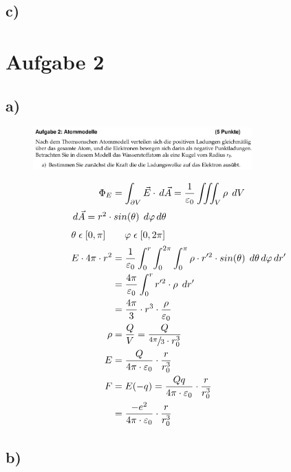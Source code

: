 \subsection{c)}

\section{Aufgabe 2}

\subsection{a)}

\begin{figure}[H]
    \centering
    \includegraphics[width=0.75\textwidth]{images/Aufgabe_2a.jpg}
    \label{fig:5}
\end{figure}

    \begin{align}
        \Phi_E &= \int_{\partial V} \vec{E} \cdot \,d\vec{A} = \frac{1}{\varepsilon_0} \iiint_{V} \rho \; \,dV\\
        \intertext{$\,d\vec{A} = r^2 \cdot sin(\theta) \; \,d\varphi \,d\theta$
        }
        \intertext{$\theta \; \epsilon \; [0,\pi] \qquad \varphi \; \epsilon \; [0, 2\pi]$
        }
        E \cdot 4\pi \cdot r^2 &= \frac{1}{\varepsilon_0} \int_{0}^{r}\int_{0}^{2\pi}\int_{0}^{\pi} \rho \cdot r'^2 \cdot sin(\theta)\; \,d\theta \,d\varphi \,dr'\\
        &= \frac{4\pi}{\varepsilon_0} \int_{0}^{r} r'^2 \cdot \rho \; \,dr'\\
        &= \frac{4\pi}{3} \cdot r^3 \cdot \frac{\rho}{\varepsilon_0}\\
        \rho &= \frac{Q}{V} = \frac{Q}{\sfrac{4\pi}{3} \cdot r_0^3}\\
        E &= \frac{Q}{4\pi \cdot \varepsilon_0} \cdot \frac{r}{r_0^3}\\
        F &= E(-q) = \frac{Qq}{4\pi \cdot \varepsilon_0} \cdot \frac{r}{r_0^3}\\
        &= \frac{-e^2}{4\pi \cdot \varepsilon_0} \cdot \frac{r}{r_0^3}
    \end{align}

\subsection{b)}

